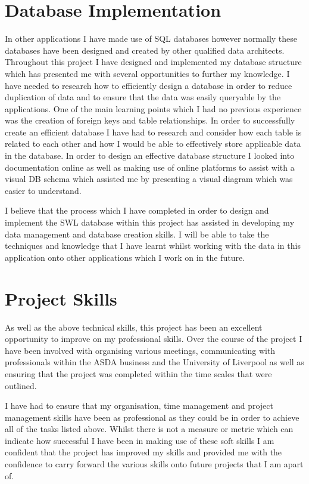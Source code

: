 \documentclass[a4paper,11pt]{report}
\begin{document}
\section{Database Implementation}
In other applications I have made use of SQL databases however normally these databases have been designed and created by other qualified data architects.
Throughout this project I have designed and implemented my database structure which has presented me with several opportunities to further my knowledge.
I have needed to research how to efficiently design a database in order to reduce duplication of data and to ensure that the data was easily queryable by the applications. 
One of the main learning points which I had no previous experience was the creation of foreign keys and table relationships.
In order to successfully create an efficient database I have had to research and consider how each table is related to each other 
and how I would be able to effectively store applicable data in the database.
In order to design an effective database structure I looked into documentation online as well as making use of online platforms
to assist with a visual DB schema which assisted me by presenting a visual diagram which was easier to understand.

I believe that the process which I have completed in order to design and implement the SWL database within this project
has assisted in developing my data management and database creation skills. 
I will be able to take the techniques and knowledge that I have learnt whilst working with the data in this application
onto other applications which I work on in the future. 


\section{Project Skills}
As well as the above technical skills, this project has been an excellent opportunity to improve on my professional skills.
Over the course of the project I have been involved with organising various meetings, communicating with professionals within the ASDA business and the University of Liverpool as well as ensuring that the project was completed within the time scales that were outlined.

I have had to ensure that my organisation, time management and project management skills have been as professional as they could be in order to achieve all of the tasks listed above. 
Whilst there is not a measure or metric which can indicate how successful I have been in making use of these soft skills I am confident that the project has improved my skills and provided me with the confidence to carry forward the various skills onto future projects that I am apart of.
\end{document}
